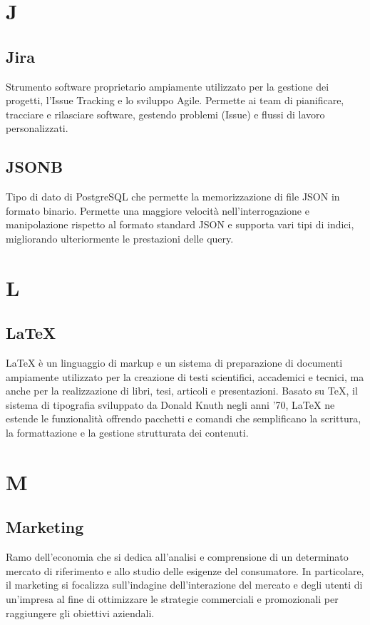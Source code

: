 \documentclass[10pt, letterpaper]{article}
\begin{document}
\section{J}

\subsection*{Jira}
Strumento software proprietario ampiamente utilizzato per la gestione dei progetti, l'Issue Tracking e lo sviluppo Agile. Permette ai team di pianificare,
tracciare e rilasciare software, gestendo problemi (Issue) e flussi di lavoro personalizzati.

\subsection*{JSONB}
Tipo di dato di PostgreSQL che permette la memorizzazione di file JSON in formato binario. Permette una maggiore velocità nell'interrogazione e manipolazione rispetto al formato standard JSON e supporta vari tipi di indici, migliorando ulteriormente le prestazioni delle query.

\section{L}

\subsection*{LaTeX}
LaTeX è un linguaggio di markup e un sistema di preparazione di documenti ampiamente utilizzato per la creazione di testi scientifici, accademici e tecnici,
ma anche per la realizzazione di libri, tesi, articoli e presentazioni. Basato su TeX, il sistema di tipografia sviluppato da Donald Knuth negli anni '70,
LaTeX ne estende le funzionalità offrendo pacchetti e comandi che semplificano la scrittura, la formattazione e la gestione strutturata dei contenuti.

\section{M}

\subsection*{Marketing}
Ramo dell'economia che si dedica all'analisi e comprensione di un determinato mercato di riferimento e allo studio delle esigenze del consumatore.
In particolare, il marketing si focalizza sull'indagine dell'interazione del mercato e degli utenti di un'impresa al fine di ottimizzare le strategie
commerciali e promozionali per raggiungere gli obiettivi aziendali.
\end{document}
